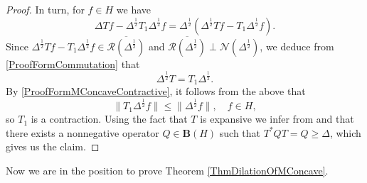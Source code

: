 \documentclass{amsart}
\renewcommand{\le}{\leqslant}
\renewcommand{\ge}{\geqslant}
\theoremstyle{definition}
\numberwithin{equation}{section}
\begin{document}
\begin{proof}
    In turn, for $ f\in H $ we have
    \begin{equation*}
        \Delta Tf - \Delta^{\frac{1}{2}}T_{1}\Delta^{\frac{1}{2}}f = \Delta^{\frac{1}{2}}(\Delta^{\frac{1}{2}}Tf - T_{1}\Delta^{\frac{1}{2}}f).
    \end{equation*}
    Since $ \Delta^{\frac{1}{2}}Tf - T_{1}\Delta^{\frac{1}{2}}f \in \overline{\mathcal{R}(\Delta^{\frac{1}{2}})} $ and $ \overline{\mathcal{R}(\Delta^{\frac{1}{2}})}\perp \mathcal{N}(\Delta^{\frac{1}{2}}) $, we deduce from \eqref{ProofFormCommutation} that
    \begin{equation}
        \Delta^{\frac{1}{2}}T = T_{1}\Delta^{\frac{1}{2}}.
    \end{equation}
    By \eqref{ProofFormMConcaveContractive}, it follows from the above that
    \begin{equation*}
        \lVert T_{1}\Delta^{\frac{1}{2}}f \rVert \le \lVert \Delta^{\frac{1}{2}}f\rVert, \quad f\in H,
    \end{equation*}
    so $ T_{1} $ is a contraction. Using the fact that $ T $ is expansive we infer from \cite[Theorem 2.1]{treilFixedPointNehariProblem} and \cite[Theorem 2.1]{biswasWeightedCommutantLifting} that there exists a nonnegative operator $ Q\in \mathbf{B}(H) $ such that $ T^{\ast}QT = Q \ge \Delta $, which gives us the claim.
\end{proof}
Now we are in the position to prove Theorem \ref{ThmDilationOfMConcave}.
\end{document}
